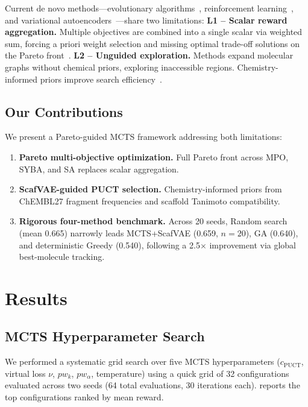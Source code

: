 \documentclass[jcim,article,layout=manuscript]{achemso}
\begin{document}
Current de novo methods---evolutionary algorithms~\cite{Jensen2019},
reinforcement learning~\cite{Olivecrona2017, Zhou2019}, and variational
autoencoders~\cite{GomezBombarelli2018}---share two limitations:
\textbf{L1 -- Scalar reward aggregation.} Multiple objectives are combined
into a single scalar via weighted sum, forcing a priori weight selection and
missing optimal trade-off solutions on the Pareto front~\cite{Mothra2024}.
\textbf{L2 -- Unguided exploration.} Methods expand molecular graphs without
chemical priors, exploring inaccessible regions. Chemistry-informed priors
improve search efficiency~\cite{CombiMOTS2026}.

\subsection{Our Contributions}

We present a Pareto-guided MCTS framework addressing both limitations:
\begin{enumerate}[label=\textbf{C\arabic*:}]
  \item \textbf{Pareto multi-objective optimization.} Full Pareto front across
    MPO, SYBA, and SA replaces scalar aggregation.
  \item \textbf{ScafVAE-guided PUCT selection.} Chemistry-informed priors from
    ChEMBL27 fragment frequencies and scaffold Tanimoto compatibility.
  \item \textbf{Rigorous four-method benchmark.} Across 20 seeds, Random search (mean 0.665) narrowly leads MCTS+ScafVAE (0.659, $n=20$), GA (0.640), and deterministic Greedy (0.540), following a 2.5$\times$ improvement via global best-molecule tracking.
\end{enumerate}

\section{Results}

\subsection{MCTS Hyperparameter Search}
\label{sec:hparam}

We performed a systematic grid search over five MCTS hyperparameters
($c_{\text{PUCT}}$, virtual loss $\nu$, $pw_k$, $pw_\alpha$, temperature)
using a quick grid of 32 configurations evaluated across two seeds
(64 total evaluations, 30 iterations each). 
reports the top configurations ranked by mean reward.
\end{document}

